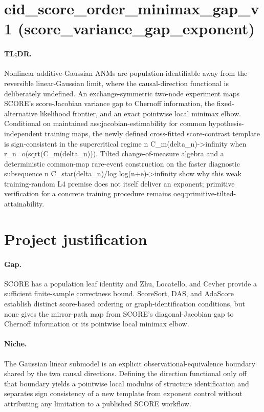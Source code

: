 \documentclass{article}
\begin{document}
\section*{eid_score_order_minimax_gap_v1 (score_variance_gap_exponent)}

\paragraph{TL;DR.} Nonlinear additive-Gaussian ANMs are population-identifiable away from the reversible linear-Gaussian limit, where the causal-direction functional is deliberately undefined. An exchange-symmetric two-node experiment maps SCORE's score-Jacobian variance gap to Chernoff information, the fixed-alternative likelihood frontier, and an exact pointwise local minimax elbow. Conditional on maintained ass:jacobian-estimability for common hypothesis-independent training maps, the newly defined cross-fitted score-contrast template is sign-consistent in the supercritical regime n C_m(delta_n)->infinity when r_n=o(sqrt(C_m(delta_n))). Tilted change-of-measure algebra and a deterministic common-map rare-event construction on the faster diagnostic subsequence n C_star(delta_n)/log log(n+e)->infinity show why this weak training-random L4 premise does not itself deliver an exponent; primitive verification for a concrete training procedure remains oeq:primitive-tilted-attainability.

\section{Project justification}

\paragraph{Gap.} SCORE has a population leaf identity and Zhu, Locatello, and Cevher provide a sufficient finite-sample correctness bound. ScoreSort, DAS, and AdaScore establish distinct score-based ordering or graph-identification conditions, but none gives the mirror-path map from SCORE's diagonal-Jacobian gap to Chernoff information or its pointwise local minimax elbow.

\paragraph{Niche.} The Gaussian linear submodel is an explicit observational-equivalence boundary shared by the two causal directions. Defining the direction functional only off that boundary yields a pointwise local modulus of structure identification and separates sign consistency of a new template from exponent control without attributing any limitation to a published SCORE workflow.
\end{document}

